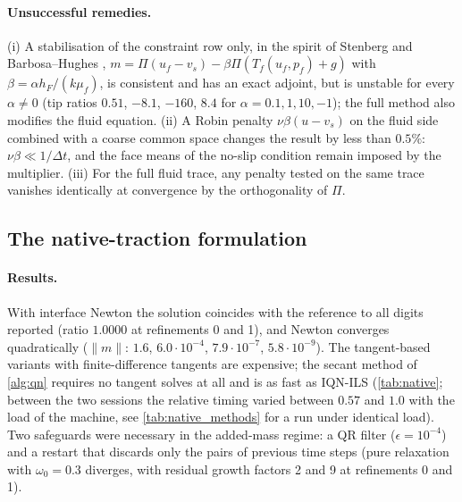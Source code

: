 \documentclass[11pt,a4paper]{article}
\theoremstyle{definition}
\theoremstyle{remark}
\begin{document}
\paragraph{Unsuccessful remedies.} (i) A stabilisation of the constraint row only, in the spirit of
Stenberg \cite{Stenberg1995} and Barbosa--Hughes \cite{BarbosaHughes1991},
$m=\Pi(u_f-v_s)-\beta\Pi(T_f(u_f,p_f)+g)$ with $\beta=\alpha h_F/(k\mu_f)$, is consistent and has
an exact adjoint, but is unstable for every $\alpha\neq0$ (tip ratios $0.51$, $-8.1$, $-160$,
$8.4$ for $\alpha=0.1,1,10,-1$); the full method also modifies the fluid equation. (ii) A Robin
penalty $\nu\beta(u-v_s)$ on the fluid side combined with a coarse common space changes the result
by less than $0.5\%$: $\nu\beta\ll1/\Delta t$, and the face means of the no-slip condition remain
imposed by the multiplier. (iii) For the full fluid trace, any penalty tested on the same trace
vanishes identically at convergence by the orthogonality of $\Pi$.

\subsection{The native-traction formulation}\label{sec:res_native}

\paragraph{Results.} With interface Newton the solution coincides with the reference to all digits
reported (ratio $1.0000$ at refinements 0 and 1), and Newton converges quadratically
($\|m\|$: $1.6$, $6.0\cdot10^{-4}$, $7.9\cdot10^{-7}$, $5.8\cdot10^{-9}$). The tangent-based
variants with finite-difference tangents are expensive; the secant method of \cref{alg:qn}
requires no tangent solves at all and is as fast as IQN-ILS (\cref{tab:native}; between the two
sessions the relative timing varied between $0.57$ and $1.0$ with the load of the machine, see
\cref{tab:native_methods} for a run under identical load). Two safeguards were necessary in the added-mass
regime: a QR filter ($\epsilon=10^{-4}$) and a restart that discards only the pairs of previous
time steps (pure relaxation with $\omega_0=0.3$ diverges, with residual growth factors 2 and 9 at
refinements 0 and 1).
\end{document}
